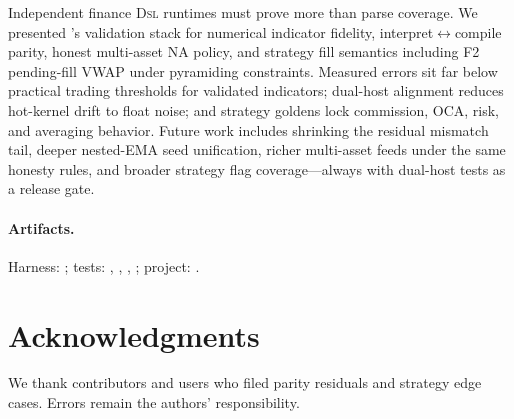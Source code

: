 \documentclass[11pt,a4paper]{article}
\begin{document}
Independent finance \textsc{Dsl} runtimes must prove more than parse coverage.
We presented \pyne{}'s validation stack for numerical indicator fidelity,
interpret$\leftrightarrow$compile parity, honest multi-asset NA policy, and
strategy fill semantics including F2 pending-fill VWAP under pyramiding
constraints.
Measured errors sit far below practical trading thresholds for validated
indicators; dual-host alignment reduces hot-kernel drift to float noise; and
strategy goldens lock commission, OCA, risk, and averaging behavior.
Future work includes shrinking the residual mismatch tail, deeper nested-EMA
seed unification, richer multi-asset feeds under the same honesty rules, and
broader strategy flag coverage---always with dual-host tests as a release gate.

\paragraph{Artifacts.}
Harness: ;
tests: ,
,
,
;
project: \citep{pynescript2026}.

\section*{Acknowledgments}
We thank \pyne{} contributors and users who filed parity residuals and strategy
edge cases. Errors remain the authors' responsibility.



\end{document}

